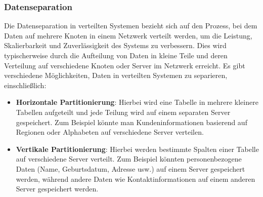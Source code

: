 \documentclass[../vs-script-first-v01.tex]{subfiles}
\begin{document}
\subsubsection{Datenseparation}

Die Datenseparation in verteilten Systemen bezieht sich auf den Prozess, bei dem Daten auf mehrere Knoten in einem Netzwerk verteilt werden, um die Leistung, Skalierbarkeit und Zuverlässigkeit des Systems zu verbessern. Dies wird typischerweise durch die Aufteilung von Daten in kleine Teile und deren Verteilung auf verschiedene Knoten oder Server im Netzwerk erreicht.
Es gibt verschiedene Möglichkeiten, Daten in verteilten Systemen zu separieren, einschließlich:
\begin{itemize}
\item \textbf{Horizontale Partitionierung}: Hierbei wird eine Tabelle in mehrere kleinere Tabellen aufgeteilt und jede Teilung wird auf einem separaten Server gespeichert. Zum Beispiel könnte man Kundeninformationen basierend auf Regionen oder Alphabeten auf verschiedene Server verteilen.
\item \textbf{Vertikale Partitionierung}: Hierbei werden bestimmte Spalten einer Tabelle auf verschiedene Server verteilt. Zum Beispiel könnten personenbezogene Daten (Name, Geburtsdatum, Adresse usw.) auf einem Server gespeichert werden, während andere Daten wie Kontaktinformationen auf einem anderen Server gespeichert werden.
\end{itemize}
\end{document}
